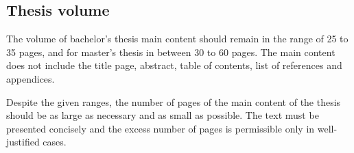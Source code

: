 \subsection{Thesis volume}

The volume of bachelor’s thesis main content should remain in the
range of 25 to 35 pages, and for master’s thesis in between 30 to 60
pages. The main content does not include the title page, abstract,
table of contents, list of references and appendices.

Despite the given ranges, the number of pages of the main content of
the thesis should be as large as necessary and as small as
possible. The text must be presented concisely and the excess number
of pages is permissible only in well-justified cases.
